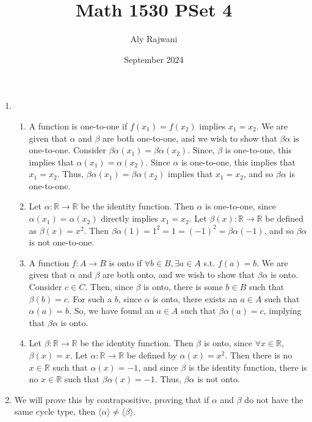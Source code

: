 \documentclass{article}
\title{Math 1530 PSet 4}
\author{Aly Rajwani}
\date{September 2024}
\begin{document}
\maketitle

\begin{enumerate}
    \item
    \begin{enumerate}
        \item A function is one-to-one if $f(x_1) = f(x_2)$ implies $x_1 = x_2$. We are given that $\alpha$ and $\beta$ are both one-to-one, and we wish to show that $\beta\alpha$ is one-to-one. Consider $\beta\alpha(x_1) = \beta\alpha(x_2)$. Since, $\beta$ is one-to-one, this implies that $\alpha(x_1) = \alpha(x_2)$. Since $\alpha$ is one-to-one, this implies that $x_1 = x_2$. Thus, $\beta\alpha(x_1) = \beta\alpha(x_2)$ implies that $x_1 = x_2$, and so $\beta\alpha$ is one-to-one. 
        
        \item Let $\alpha: \mathbb{R} \rightarrow \mathbb{R}$ be the identity function. Then $\alpha$ is one-to-one, since $\alpha(x_1) = \alpha(x_2)$ directly implies $x_1 = x_2$. Let $\beta(x): \mathbb{R} \rightarrow \mathbb{R}$ be defined as $\beta(x) = x^2$. Then $\beta\alpha(1) = 1^2 = 1 = (-1)^2 = \beta\alpha(-1)$, and so $\beta\alpha$ is not one-to-one.
        
        \item A function $f: A \rightarrow B$ is onto if $\forall b \in B, \exists a \in A$ s.t. $f(a) = b$. We are given that $\alpha$ and $\beta$ are both onto, and we wish to show that $\beta\alpha$ is onto. Consider $c \in C$. Then, since $\beta$ is onto, there is some $b \in B$ such that $\beta(b) = c$. For such a $b$, since $\alpha$ is onto, there exists an $a \in A$ such that $\alpha(a) = b$. So, we have found an $a \in A$ such that $\beta\alpha(a) = c$, implying that $\beta\alpha$ is onto.
        
        \item Let $\beta: \mathbb{R} \rightarrow \mathbb{R}$ be the identity function. Then $\beta$ is onto, since $\forall x \in \mathbb{R}$, $\beta(x) = x$. Let $\alpha: \mathbb{R} \rightarrow \mathbb{R}$ be defined by $\alpha(x) = x^2$. Then there is no $x \in \mathbb{R}$ such that $\alpha(x) = -1$, and since $\beta$ is the identity function, there is no $x \in \mathbb{R}$ such that $\beta\alpha(x) = -1$. Thus, $\beta\alpha$ is not onto. 
    \end{enumerate}
    \item We will prove this by contrapositive, proving that if $\alpha$ and $\beta$ do not have the same cycle type, then $\langle\alpha\rangle \neq \langle\beta\rangle$. 


\end{enumerate}
\end{document}
